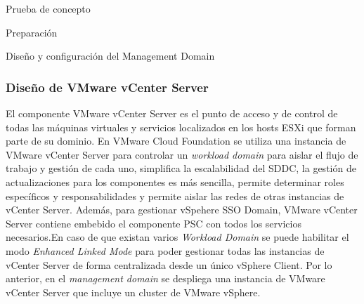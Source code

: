 \begin{section}{Prueba de concepto}
\begin{subsection}{Preparación}
\end{subsection}
\begin{subsection}{Diseño y configuración del Management Domain}
    
    
    
    
    \subsubsection{Diseño de VMware vCenter Server}
    El componente VMware vCenter Server es el punto de acceso y de control de todas las máquinas virtuales y servicios localizados en los hosts ESXi que forman parte de su dominio. En VMware Cloud Foundation se utiliza una instancia de VMware vCenter Server para controlar un \textit{workload domain} para aislar el flujo de trabajo y gestión de cada uno, simplifica la escalabilidad del SDDC, la gestión de actualizaciones para los componentes es más sencilla, permite determinar roles específicos y responsabilidades y permite aislar las redes de otras instancias de vCenter Server. Además, para gestionar vSpehere SSO Domain, VMware vCenter Server contiene embebido el componente PSC con todos los servicios necesarios.En caso de que existan varios \textit{Workload Domain} se puede habilitar el modo \textit{Enhanced Linked Mode} para poder gestionar todas las instancias de vCenter Server de forma centralizada desde un único vSphere Client.
    Por lo anterior, en el \textit{management domain} se despliega una instancia de VMware vCenter Server que incluye un cluster de VMware vSphere.
    
    
    

\end{subsection}
\end{section}
